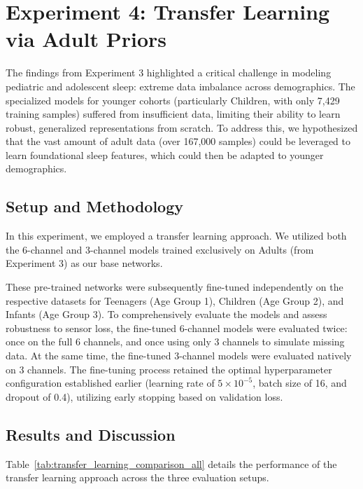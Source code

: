 \FloatBarrier
\section{Experiment 4: Transfer Learning via Adult Priors}

The findings from Experiment 3 highlighted a critical challenge in modeling pediatric and adolescent sleep: extreme data imbalance across demographics. The specialized models for younger cohorts (particularly Children, with only 7,429 training samples) suffered from insufficient data, limiting their ability to learn robust, generalized representations from scratch. To address this, we hypothesized that the vast amount of adult data (over 167,000 samples) could be leveraged to learn foundational sleep features, which could then be adapted to younger demographics.

\subsection{Setup and Methodology}
In this experiment, we employed a transfer learning approach. We utilized both the 6-channel and 3-channel models trained exclusively on Adults (from Experiment 3) as our base networks. 

These pre-trained networks were subsequently fine-tuned independently on the respective datasets for Teenagers (Age Group 1), Children (Age Group 2), and Infants (Age Group 3). To comprehensively evaluate the models and assess robustness to sensor loss, the fine-tuned 6-channel models were evaluated twice: once on the full 6 channels, and once using only 3 channels to simulate missing data. At the same time, the fine-tuned 3-channel models were evaluated natively on 3 channels. The fine-tuning process retained the optimal hyperparameter configuration established earlier (learning rate of $5 \times 10^{-5}$, batch size of 16, and dropout of 0.4), utilizing early stopping based on validation loss.

\subsection{Results and Discussion}

Table~\ref{tab:transfer_learning_comparison_all} details the performance of the transfer learning approach across the three evaluation setups. 

